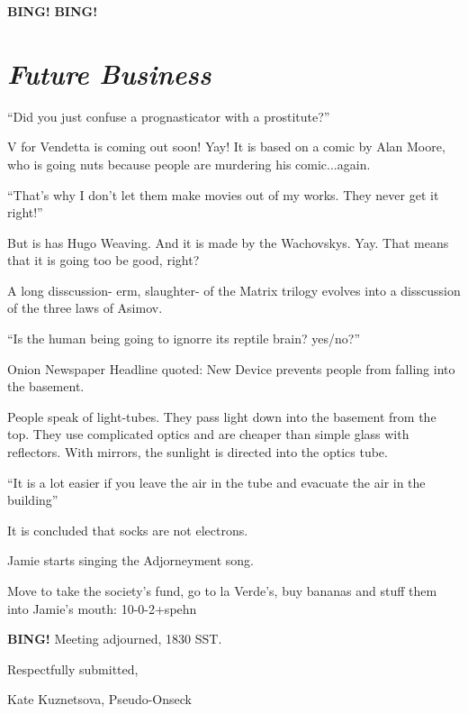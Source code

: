 \documentclass[10pt]{article}
\newcommand{\bing}{{\bf BING!} }
\newcommand{\goto}[1]{\bing \vskip 12pt \section*{{\em{#1}}}}
\begin{document}
\bing
\goto{Future Business}
``Did you just confuse a prognasticator with a prostitute?''

V for Vendetta is coming out soon! Yay! It is based on a comic by Alan Moore, who is going nuts because people are murdering his comic...again.

``That's why I don't let them make movies out of my works. They never get it right!''

But is has Hugo Weaving. And it is made by the Wachovskys. Yay. That means that it is going too be good, right?

A long disscussion- erm, slaughter- of the Matrix trilogy evolves into a disscussion of the three laws of Asimov.

``Is the human being going to ignorre its reptile brain? yes/no?''

Onion Newspaper Headline quoted: New Device prevents people from falling into the basement.

People speak of light-tubes. They pass light down into the basement from the top. They use complicated optics and are cheaper than simple glass with reflectors. With mirrors, the sunlight is directed into the optics tube. 

``It is a lot easier if you leave the air in the tube and evacuate the air in the building''

It is concluded that socks are not electrons.

Jamie starts singing the Adjorneyment song.

Move to take the society's fund, go to la Verde's, buy bananas and stuff them into Jamie's mouth: 10-0-2+spehn

\bing
\noindent
Meeting adjourned, 1830 SST.

\vspace{18pt}

\centerline{Respectfully submitted,}
\centerline{Kate Kuznetsova, Pseudo-Onseck}
\end{document}
